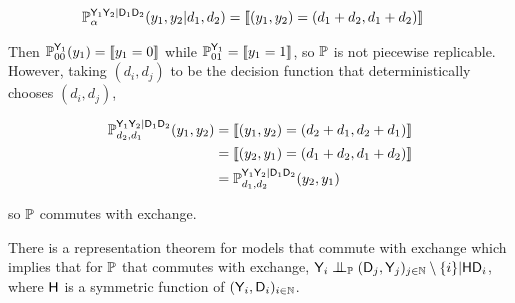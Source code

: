 \begin{align}
    \mathbb{P}_\alpha^{\mathsf{Y}_1\mathsf{Y}_2|\mathsf{D}_1\mathsf{D}_2}(y_1,y_2|d_1,d_2) &= \llbracket (y_1,y_2)= (d_1+d_2,d_1+d_2) \rrbracket
\end{align}

Then $\mathbb{P}_{00}^{\mathsf{Y}_1}(y_1) = \llbracket y_1=0\rrbracket$ while $\mathbb{P}_{01}^{\mathsf{Y}_1} = \llbracket y_1=1 \rrbracket$, so $\mathbb{P}$ is not piecewise replicable. However, taking $(d_i,d_j)$ to be the decision function that deterministically chooses $(d_i,d_j)$,

\begin{align}
    \mathbb{P}_{d_2,d_1}^{\mathsf{Y}_1\mathsf{Y}_2|\mathsf{D}_1\mathsf{D}_2}(y_1,y_2) &= \llbracket (y_1,y_2)= (d_2+d_1,d_2+d_1) \rrbracket\\
    &= \llbracket (y_2,y_1)= (d_1+d_2,d_1+d_2) \rrbracket\\
    &= \mathbb{P}_{d_1,d_2}^{\mathsf{Y}_1\mathsf{Y}_2|\mathsf{D}_1\mathsf{D}_2}(y_2,y_1)
\end{align}

so $\mathbb{P}$ commutes with exchange.

There is a representation theorem for models that commute with exchange which implies that for $\mathbb{P}$ that commutes with exchange, $\RV{Y}_i\CI_{\prob{P}}(\RV{D}_j,\RV{Y}_j)_{j\in \mathbb{N}}\setminus \{i\}|\RV{H}\RV{D}_i$, where $\mathsf{H}$ is a symmetric function of $(\mathsf{Y}_i,\mathsf{D}_i)_{i\in\mathbb{N}}$.




